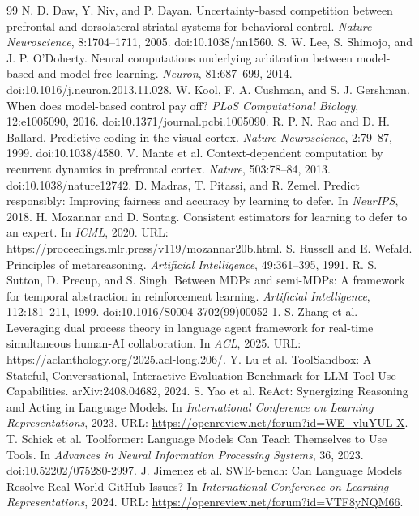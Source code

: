 \documentclass[11pt]{article}
\begin{document}
\footnotesize
\begin{thebibliography}{99}
 N. D. Daw, Y. Niv, and P. Dayan. Uncertainty-based competition between prefrontal and dorsolateral striatal systems for behavioral control. \emph{Nature Neuroscience}, 8:1704--1711, 2005. doi:10.1038/nn1560.
 S. W. Lee, S. Shimojo, and J. P. O'Doherty. Neural computations underlying arbitration between model-based and model-free learning. \emph{Neuron}, 81:687--699, 2014. doi:10.1016/j.neuron.2013.11.028.
 W. Kool, F. A. Cushman, and S. J. Gershman. When does model-based control pay off? \emph{PLoS Computational Biology}, 12:e1005090, 2016. doi:10.1371/journal.pcbi.1005090.
 R. P. N. Rao and D. H. Ballard. Predictive coding in the visual cortex. \emph{Nature Neuroscience}, 2:79--87, 1999. doi:10.1038/4580.
 V. Mante et al. Context-dependent computation by recurrent dynamics in prefrontal cortex. \emph{Nature}, 503:78--84, 2013. doi:10.1038/nature12742.
 D. Madras, T. Pitassi, and R. Zemel. Predict responsibly: Improving fairness and accuracy by learning to defer. In \emph{NeurIPS}, 2018.
 H. Mozannar and D. Sontag. Consistent estimators for learning to defer to an expert. In \emph{ICML}, 2020. URL: \url{https://proceedings.mlr.press/v119/mozannar20b.html}.
 S. Russell and E. Wefald. Principles of metareasoning. \emph{Artificial Intelligence}, 49:361--395, 1991.
 R. S. Sutton, D. Precup, and S. Singh. Between MDPs and semi-MDPs: A framework for temporal abstraction in reinforcement learning. \emph{Artificial Intelligence}, 112:181--211, 1999. doi:10.1016/S0004-3702(99)00052-1.
 S. Zhang et al. Leveraging dual process theory in language agent framework for real-time simultaneous human-AI collaboration. In \emph{ACL}, 2025. URL: \url{https://aclanthology.org/2025.acl-long.206/}.
 Y. Lu et al. ToolSandbox: A Stateful, Conversational, Interactive Evaluation Benchmark for LLM Tool Use Capabilities. arXiv:2408.04682, 2024.
 S. Yao et al. ReAct: Synergizing Reasoning and Acting in Language Models. In \emph{International Conference on Learning Representations}, 2023. URL: \url{https://openreview.net/forum?id=WE_vluYUL-X}.
 T. Schick et al. Toolformer: Language Models Can Teach Themselves to Use Tools. In \emph{Advances in Neural Information Processing Systems}, 36, 2023. doi:10.52202/075280-2997.
 J. Jimenez et al. SWE-bench: Can Language Models Resolve Real-World GitHub Issues? In \emph{International Conference on Learning Representations}, 2024. URL: \url{https://openreview.net/forum?id=VTF8yNQM66}.

\end{thebibliography}
\end{document}

